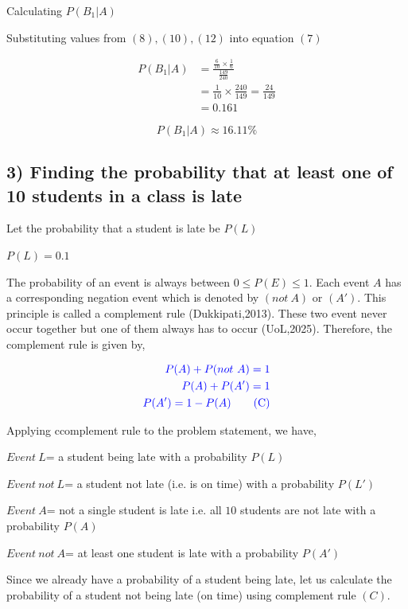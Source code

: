\documentclass[a4paper]{report}
\begin{document}
Calculating $P(B_1|A)$

Substituting values from $(8),(10),(12)$ into equation $(7)$

\begin{align*}
    P(B_1|A)&=\frac{\frac{6}{10}\times \frac{1}{6}}{\frac{149}{240}} \\
    &=\frac{1}{10} \times \frac{240}{149}=\frac{24}{149} \\
    &=0.161
\end{align*}

\begin{equation*}
    \boxed{P(B_1|A)\approx 16.11\%}
\end{equation*}


\subsection*{3) Finding the probability that at least one of 10 students in a class is late }

Let the probability that a student is late be $P(L)$

$P(L)=0.1$

The probability of an event is always between $0\leq P(E)\leq 1$. Each event $A$ has a corresponding negation event which is denoted by $(not\ A)$ or $(A')$. This principle is called a complement rule (Dukkipati,2013). These two event never occur together but one of them always has to occur (UoL,2025). Therefore, the complement rule is given by,

\begin{align*}
    \color{blue} P(A)+P(not\ A)=1 \\
    \color{blue} P(A)+P(A')=1 \\
    \color{blue} P(A')=1-P(A) \tag{\color{blue}C}
\end{align*}


Applying ccomplement rule to the problem statement, we have,

$Event\ L$= a student being late with a probability $P(L)$

$Event\ not\ L$= a student not late (i.e. is on time) with a probability $P(L')$

$Event\ A$= not a single student is late i.e. all $10$ students are not late with a probability $P(A)$

$Event\ not\ A$= at least one student is late with a probability $P(A')$


Since we already have a probability of a student being late, let us calculate the probability of a student not being late (on time) using complement rule $(C)$.
\end{document}
